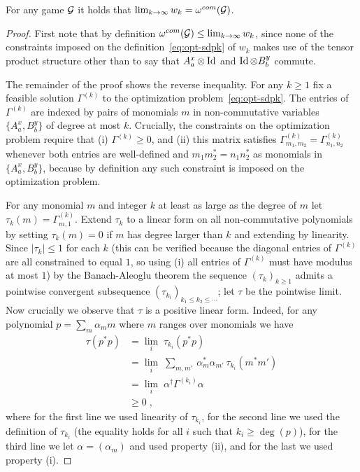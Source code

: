 \begin{lemma}
For any game $\mathcal{G}$ it holds that $\lim_{k\to\infty} w_k = \omega^{com}(\mathcal{G})$.
\end{lemma}

\begin{proof}
First note that by definition $\omega^{com}(\mathcal{G})\leq \lim_{k\to\infty} w_k$, since none of the constraints imposed on the definition~\eqref{eq:opt-sdpk} of $w_k$ makes use of the tensor product structure other than to say that $A^x_a \otimes \mathop{\rm Id}\nolimits$ and $\mathop{\rm Id}\nolimits\otimes B^y_b$ commute. 

The remainder of the proof shows the reverse inequality. For any $k\geq 1$ fix a feasible solution $\Gamma^{(k)}$ to the optimization problem~\eqref{eq:opt-sdpk}. The entries of $\Gamma^{(k)}$ are indexed by pairs of monomials $m$ in non-commutative variables $\{A^x_a,B^y_b\}$ of degree at most $k$. 
Crucially, the constraints on the optimization problem require that (i) $\Gamma^{(k)} \geq 0$, and (ii) this matrix satisfies $\Gamma^{(k)}_{m_1,m_2}=\Gamma^{(k)}_{n_1,n_2}$ whenever both entries are well-defined and $m_1 m_2^* = n_1 n_2^*$ as monomials in $\{A^x_a,B^y_b\}$, because by definition any such constraint is imposed on the optimization problem. 

For any monomial $m$ and integer $k$ at least as large as the degree of $m$ let $\tau_k(m) = \Gamma^{(k)}_{m,1}$. 
Extend $\tau_k$ to a linear form on all non-commutative polynomials by setting $\tau_k(m)=0$ if $m$ has degree larger than $k$ and extending by linearity. Since $|\tau_k|\leq 1$ for each $k$ (this can be verified because the diagonal entries of $\Gamma^{(k)}$ are all constrained to equal $1$, so using (i) all entries of $\Gamma^{(k)}$ must have modulus at most $1$) by the Banach-Aleoglu theorem the sequence $(\tau_k)_{k\geq 1}$ admits a pointwise convergent subsequence $(\tau_{k_i})_{k_1\leq k_2\leq\cdots}$; let $\tau$ be the pointwise limit. Now crucially we observe that $\tau$ is a positive linear form. Indeed, for any polynomial $p = \sum_m \alpha_m m$ where $m$ ranges over monomials we have 
\begin{align*}
 \tau(p^*p) &= \lim_i \;\tau_{k_i}(p^*p) \\
&=  \lim_i \;\sum_{m,m'} \,\alpha_m^* \alpha_{m'} \,\tau_{k_i}(m^*m') \\
&= \lim_i \;\alpha^\dagger \Gamma^{(k_i)} \alpha\\
& \geq 0\;,
\end{align*}
where for the first line we used linearity of $\tau_{k_i}$, for the second line we used the definition of $\tau_{k_i}$ (the equality holds for all $i$ such that $k_i \geq \deg(p)$), for the third line we let $\alpha = (\alpha_m)$ and used property (ii), and for the last we used property (i). 


\end{proof}
